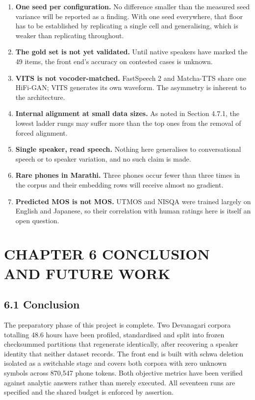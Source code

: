 \documentclass[12pt,a4paper]{article}
\begin{document}
\begin{enumerate}[leftmargin=1.9em,itemsep=2pt,topsep=3pt]
  \item \textbf{One seed per configuration.} No difference smaller than the measured seed variance will be reported as a finding. With one seed everywhere, that floor has to be established by replicating a single cell and generalising, which is weaker than replicating throughout.
  \item \textbf{The gold set is not yet validated.} Until native speakers have marked the 49 items, the front end's accuracy on contested cases is unknown.
  \item \textbf{VITS is not vocoder-matched.} FastSpeech 2 and Matcha-TTS share one HiFi-GAN; VITS generates its own waveform. The asymmetry is inherent to the architecture.
  \item \textbf{Internal alignment at small data sizes.} As noted in Section 4.7.1, the lowest ladder rungs may suffer more than the top ones from the removal of forced alignment.
  \item \textbf{Single speaker, read speech.} Nothing here generalises to conversational speech or to speaker variation, and no such claim is made.
  \item \textbf{Rare phones in Marathi.} Three phones occur fewer than three times in the corpus and their embedding rows will receive almost no gradient.
  \item \textbf{Predicted MOS is not MOS.} UTMOS and NISQA were trained largely on English and Japanese, so their correlation with human ratings here is itself an open question.
\end{enumerate}

\section*{CHAPTER 6  CONCLUSION AND FUTURE WORK}
\subsection*{6.1  Conclusion}
The preparatory phase of this project is complete. Two Devanagari corpora totalling 48.6 hours have been profiled, standardised and split into frozen checksummed partitions that regenerate identically, after recovering a speaker identity that neither dataset records. The front end is built with schwa deletion isolated as a switchable stage and covers both corpora with zero unknown symbols across 870,547 phone tokens. Both objective metrics have been verified against analytic answers rather than merely executed. All seventeen runs are specified and the shared budget is enforced by assertion.
\end{document}

